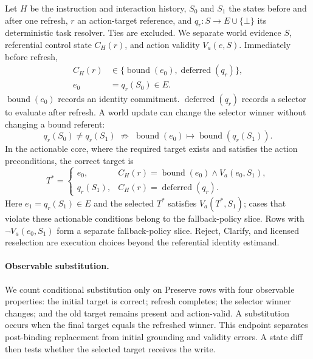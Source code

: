 \documentclass[letterpaper]{article}
\begin{document}
Let $H$ be the instruction and interaction history, $S_0$ and $S_1$ the states before and after one
refresh, $r$ an action-target reference, and $q_r:S\rightarrow E\cup\{\bot\}$ its deterministic
task resolver. Ties are excluded. We separate world evidence $S$, referential control state
$C_H(r)$, and action validity $V_a(e,S)$. Immediately before refresh,
\begin{equation}
\begin{aligned}
C_H(r)&\in\{\operatorname{bound}(e_0),\operatorname{deferred}(q_r)\},\\
e_0&=q_r(S_0)\in E.
\end{aligned}
\end{equation}
$\operatorname{bound}(e_0)$ records an identity commitment. $\operatorname{deferred}(q_r)$ records
a selector to evaluate after refresh. A world update can change the selector winner without
changing a bound referent:
\begin{equation}
q_r(S_0)\ne q_r(S_1)\;\not\Rightarrow\;
\operatorname{bound}(e_0)\mapsto\operatorname{bound}(q_r(S_1)).
\end{equation}
In the actionable core, where the required target exists and satisfies the action preconditions,
the correct target is
\begin{equation}
T^*=\begin{cases}
e_0, & C_H(r)=\operatorname{bound}(e_0)\land V_a(e_0,S_1),\\
q_r(S_1), & C_H(r)=\operatorname{deferred}(q_r).
\end{cases}
\end{equation}
Here $e_1=q_r(S_1)\in E$ and the selected $T^*$ satisfies $V_a(T^*,S_1)$; cases that violate
these actionable conditions belong to the fallback-policy slice.
Rows with $\neg V_a(e_0,S_1)$ form a separate fallback-policy slice. Reject, Clarify, and licensed
reselection are execution choices beyond the referential identity estimand.

\paragraph{Observable substitution.}
We count conditional substitution only on Preserve rows with four observable properties: the
initial target is correct; refresh completes; the selector winner changes; and the old target
remains present and action-valid. A substitution occurs when the final target equals the refreshed
winner. This endpoint separates post-binding replacement from initial grounding and validity
errors. A state diff then tests whether the selected target receives the write.
\end{document}
